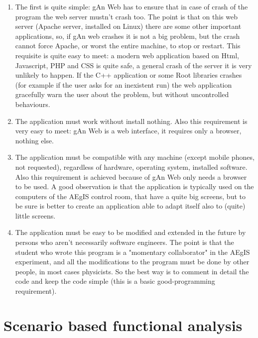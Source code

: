 \begin{enumerate}

\item The first is quite simple: gAn Web has to ensure that in case of crash of the program the web server mustn't crash too. The point is that on this web server (Apache server, installed on Linux) there are some other important applications, so, if gAn web crashes it is not a big problem, but the crash cannot force Apache, or worst the entire machine, to stop or restart. 
This requisite is quite easy to meet: a modern web application based on Html, Javascript, PHP and CSS is quite safe, a general crash of the server it is very unlikely to happen. If the C++ application or some Root libraries crashes (for example if the user asks for an inexistent run) the web application gracefully warn the user about the problem, but without uncontrolled behaviours.  

\item The application must work without install nothing. Also this requirement is very easy to meet: gAn Web is a web interface, it requires only a browser, nothing else.

\item The application must be compatible with any machine (except mobile phones, not requested), regardless of hardware, operating system, installed software. Also this requirement is achieved because of gAn Web only needs a browser to be used. A good observation is that the application is typically used on the computers of the AEgIS control room, that have a quite big screens, but to be sure is better to create an application able to adapt itself also to (quite) little screens.  

\item The application must be easy to be modified and extended in the future by persons who aren't necessarily software engineers. The point is that the student who wrote this program is a "momentary collaborator" in the AEgIS experiment, and all the modifications to the program must be done by other people, in most cases physicists. So the best way is to comment in detail the code and keep the code simple (this is a basic good-programming requirement).   


\end{enumerate}

\section{Scenario based functional analysis}

